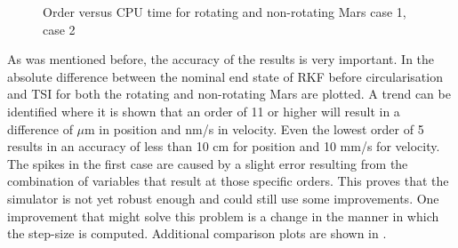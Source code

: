 \begin{figure}[H]
\centering
{} 
\caption{Order versus CPU time for rotating and non-rotating Mars \protect{} case 1,  \protect{} case 2 } 
\label{fig:orderVsCPUcase1combined} 
\end{figure} 

\noindent
As was mentioned before, the accuracy of  the results is very important. In  the absolute difference between the nominal end state of \ac{RKF} before circularisation and \ac{TSI} for both the rotating and non-rotating Mars are plotted. A trend can be identified where it is shown that an order of 11 or higher will result in a difference of $\mu$m in position and nm/s in velocity. Even the lowest order of 5 results in an accuracy of less than 10 cm for position and 10 mm/s for velocity. The spikes in the first case are caused by a slight error resulting from the combination of variables that result at those specific orders. This proves that the simulator is not yet robust enough and could still use some improvements. One improvement that might solve this problem is a change in the manner in which the step-size is computed. Additional comparison plots are shown in .

